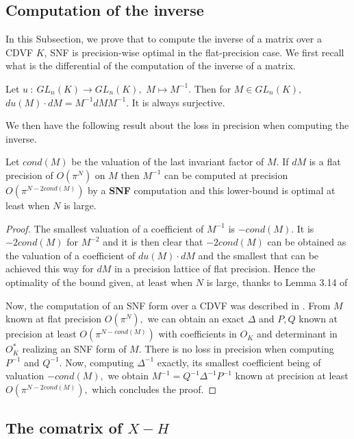 \documentclass{sig-alternate-05-2015}
\begin{document}
\subsection{Computation of the inverse}

In this Subsection, we prove that to compute the inverse of
a matrix over a CDVF $K$, SNF is precision-wise optimal in the flat-precision case.
We first recall what is the differential of the computation of the inverse of a matrix.

\begin{lem}
Let $u \: : \: GL_n (K) \rightarrow GL_n(K),$ $M \mapsto M^{-1}.$
Then for $M \in GL_n (K),$ $du(M) \cdot dM=M^{-1} dM M^{-1}.$
It is always surjective.
\end{lem}

We then have the following result about the loss in precision when computing the inverse.

\begin{prop}
Let $cond(M)$ be the valuation of the last invariant factor of $M.$
If $dM$ is a flat precision of $O(\pi^N)$ on $M$ then $M^{-1}$
can be computed at precision $O(\pi^{N-2cond(M)})$ by a \textbf{SNF} computation
and this lower-bound is optimal
at least when $N$ is large.
\end{prop}
\begin{proof}
The smallest valuation of a coefficient of $M^{-1}$ is $-cond(M).$
It is $-2cond(M)$ for $M^{-2}$ and it is then clear that $-2cond(M)$
can be obtained as the valuation of a coefficient of $du(M) \cdot dM$
and the smallest that can be achieved this way for $dM$ in a precision lattice
of flat precision. Hence the optimality of the bound given, at least when 
$N$ is large, thanks to Lemma 3.14 of \cite{caruso-roe-vaccon:14a}

Now, the computation of an SNF form over a CDVF was described in \cite{Vaccon-these}.
From $M$ known at flat precision $O(\pi^N),$ we can obtain an exact $\Delta$ and $P,Q$ 
known at precision at least $O(\pi^{N-cond(M)})$ with coefficients in $O_K$
and determinant in $O_K^*$ realizing an SNF form of $M.$
There is no loss in precision when computing $P^{-1}$ and $Q^{-1}.$
Now, computing $\Delta^{-1}$ exactly, its smallest coefficient being  of valuation $-cond(M),$
we obtain $M^{-1}=Q^{-1} \Delta^{-1} P^{-1}$ known at precision at least $O(\pi^{N-2cond(M)}),$
which concludes the proof.
\end{proof}



\subsection{The comatrix of $X{-}H$}
\end{document}
